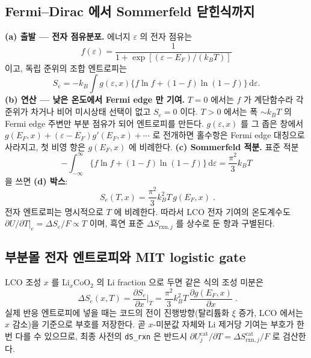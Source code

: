 \documentclass[11pt,a4paper]{article}
\newcommand{\dd}{\mathrm{d}}
\newcommand{\rxn}{\mathrm{rxn}}
\newcommand{\cat}{\mathrm{cat}}
\newcommand{\code}[1]{\texttt{#1}}
\begin{document}
\subsection{Fermi--Dirac 에서 Sommerfeld 닫힌식까지}
\textbf{(a) 출발 — 전자 점유분포.} 에너지 $\varepsilon$ 의 전자 점유는
\begin{equation}
f(\varepsilon)=\frac{1}{1+\exp[(\varepsilon-E_F)/(k_BT)]}
\label{eq:fd}
\end{equation}
이고, 독립 준위의 조합 엔트로피는
\begin{equation}
S_e=-k_B\int g(\varepsilon,x)\{f\ln f+(1-f)\ln(1-f)\}\,\dd\varepsilon .
\label{eq:seint}
\end{equation}
\textbf{(b) 연산 — 낮은 온도에서 Fermi edge 만 기여.} $T=0$ 에서는 $f$ 가 계단함수라 각 준위가 차거나 비어
미시상태 선택이 없고 $S_e=0$ 이다. $T>0$ 에서는 폭 $\sim k_BT$ 의 Fermi edge 주변만 부분 점유가 되어
엔트로피를 만든다. $g(\varepsilon,x)$ 를 그 좁은 창에서
$g(E_F,x)+(\varepsilon-E_F)g'(E_F,x)+\cdots$ 로 전개하면 홀수항은 Fermi edge 대칭으로 사라지고, 첫 비영 항은
$g(E_F,x)$ 에 비례한다. \textbf{(c) Sommerfeld 적분.} 표준 적분
\begin{equation}
-\int_{-\infty}^{\infty}\{f\ln f+(1-f)\ln(1-f)\}\,\dd\varepsilon
=\frac{\pi^2}{3}k_BT
\label{eq:sommerfeldint}
\end{equation}
을 쓰면 \textbf{(d) 박스}:
\begin{equation}
\boxed{\;S_e(T,x)=\frac{\pi^2}{3}k_B^2T\,g(E_F,x)\;.}
\label{eq:Se}
\end{equation}
전자 엔트로피는 명시적으로 $T$ 에 비례한다. 따라서 LCO 전자 기여의 온도계수도
$\partial U/\partial T|_e=\Delta S_e/F\propto T$ 이며, 흑연 표준 $\Delta S_{\rxn,j}$ 를 상수로 둔 항과 구별된다.

\subsection{부분몰 전자 엔트로피와 MIT logistic gate}
LCO 조성 $x$ 를 Li$_x$CoO$_2$ 의 Li fraction 으로 두면 같은 식의 조성 미분은
\begin{equation}
\boxed{\;\Delta S_e(x,T)=\frac{\partial S_e}{\partial x}\Big|_T
=\frac{\pi^2}{3}k_B^2T\,\frac{\partial g(E_F,x)}{\partial x}\;.}
\label{eq:dSe}
\end{equation}
실제 반응 엔트로피에 넣을 때는 코드의 전이 진행방향(탈리튬화 $\xi$ 증가, LCO 에서는 $x$ 감소)을 기준으로 부호를
저장한다. 곧 $x$-미분값 자체와 Li 제거당 기여는 부호가 한 번 다를 수 있으므로, 최종 사전의
\code{dS\_rxn} 은 반드시 $\partial U_j^\cat/\partial T=\Delta S_{\rxn,j}^\cat/F$ 로 검산한다.
\end{document}
